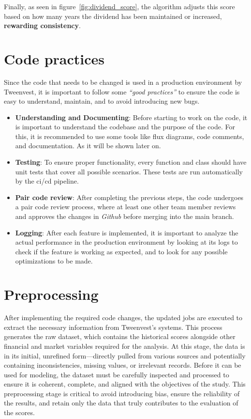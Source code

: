 \documentclass[11pt,english,a4paper,hidelinks]{book}
\begin{document}
\noindent Finally, as seen in figure~\ref{fig:dividend_score}, the algorithm adjusts this score based on how many years the dividend has been maintained or increased, \textbf{rewarding consistency}.

\section{Code practices}
Since the code that needs to be changed is used in a production environment by Tweenvest, it is important to follow some \textit{``good practices''} to ensure the code is easy to understand, maintain, and to avoid introducing new bugs.

\begin{itemize}
  \item \textbf{Understanding and Documenting}: Before starting to work on the code, it is important to understand the codebase and the purpose of the code. For this, it is recommended to use some tools like flux diagrams, code comments, and documentation. As it will be shown later on.
  \item \textbf{Testing}: To ensure proper functionality, every function and class should have unit tests that cover all possible scenarios. These tests are run automatically by the \acrshort{ci/cd} pipeline.
  \item \textbf{Pair code review}: After completing the previous steps, the code undergoes a pair code review process, where at least one other team member reviews and approves the changes in \textit{Github} before merging into the main branch.
  \item \textbf{Logging}: After each feature is implemented, it is important to analyze the actual performance in the production environment by looking at its logs to check if the feature is working as expected, and to look for any possible optimizations to be made.
\end{itemize}

\section{Preprocessing}

After implementing the required code changes, the updated \acrshort{job}s are executed to extract the necessary information from Tweenvest’s systems. This process generates the raw dataset, which contains the historical scores alongside other financial and market variables required for the analysis. At this stage, the data is in its initial, unrefined form—directly pulled from various sources and potentially containing inconsistencies, missing values, or irrelevant records. Before it can be used for modeling, the dataset must be carefully inspected and processed to ensure it is coherent, complete, and aligned with the objectives of the study. This preprocessing stage is critical to avoid introducing bias, ensure the reliability of the results, and retain only the data that truly contributes to the evaluation of the scores.
\end{document}

